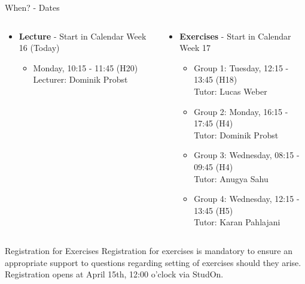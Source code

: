 \begin{frame}{When? - Dates}
	\begin{columns}
		\begin{column}{0.5\textwidth}
			\begin{itemize}
				\item \textbf{Lecture} - Start in Calendar Week 16 (Today)
				      \begin{itemize}
					      \item Monday, 10:15 - 11:45 (H20) \\
					            {\color{gray}Lecturer: Dominik Probst}
				      \end{itemize}
			\end{itemize}
		\end{column}

		\begin{column}{0.5\textwidth}
			\begin{itemize}
				\item \textbf{Exercises} - Start in Calendar Week 17
				      \begin{itemize}
					      \item Group 1: Tuesday, 12:15 - 13:45 (H18) \\
					            {\color{gray}Tutor: Lucas Weber}
					      \item Group 2: Monday, 16:15 - 17:45 (H4) \\
					            {\color{gray}Tutor: Dominik Probst}
					      \item Group 3: Wednesday, 08:15 - 09:45 (H4) \\
					            {\color{gray}Tutor: Anugya Sahu}
					      \item Group 4: Wednesday, 12:15 - 13:45 (H5) \\
					            {\color{gray}Tutor: Karan Pahlajani}
				      \end{itemize}
			\end{itemize}
		\end{column}
	\end{columns}

	\begin{block}{Registration for Exercises}
		Registration for exercises is mandatory to ensure an appropriate support to questions regarding setting of exercises should they arise.
			{\color{faured}Registration opens at April 15th, 12:00 o'clock via StudOn.}
	\end{block}
\end{frame}

